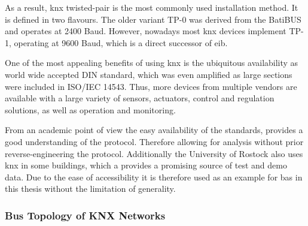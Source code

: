 As a result, \gls{knx} twisted-pair is the most commonly used installation method.
It is defined in two flavours. \parencite{DIN_EN_50090-5-2}
The older variant TP-0 was derived from the BatiBUS  and operates at 2400 Baud. However, nowadays most \gls{knx} devices implement TP-1, operating at 9600 Baud, which is a direct successor of \gls{eib}.

One of the most appealing benefits of using \gls{knx} is the ubiquitous availability as world wide accepted DIN standard, which was even amplified as large sections were included in ISO/IEC 14543.
Thus, more devices from multiple vendors are available with a large variety of sensors, actuators, control and regulation solutions, as well as operation and monitoring.

From an academic point of view the easy availability of the standards, provides a good understanding of the protocol. Therefore allowing for analysis without prior reverse-engineering the protocol.
Additionally the University of Rostock also uses \gls{knx} in some buildings, which a provides a promising source of test and demo data. \parencite[cf.][]{Mundt2012}
Due to the ease of accessibility it is therefore used as an example for \gls{bas} in this thesis without the limitation of generality.

\subsubsection{Bus Topology of KNX Networks}
\label{sec:background:bas:knx:topo}

